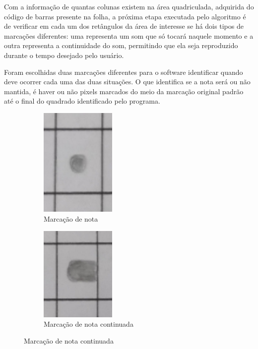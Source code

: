 \documentclass[12pt]{report}
\begin{document}
Com a informação de quantas colunas existem na área quadriculada,
adquirida do código de barras presente na folha, a próxima etapa
executada pelo algoritmo é de verificar em cada um dos retângulos da
área de interesse se há dois tipos de marcações diferentes: uma
representa um som que só tocará naquele momento e a outra representa a
continuidade do som, permitindo que ela seja reproduzido durante o
tempo desejado pelo usuário.

Foram escolhidas duas marcações diferentes para o software identificar
quando deve ocorrer cada uma das duas situações. O que identifica se a
nota será ou não mantida, é haver ou não pixels marcados do meio da
marcação original padrão até o final do quadrado identificado pelo
programa.

\begin{figure}[H]
  \centering
  \begin{subfigure}{0.4\textwidth}
    \centering
    \includegraphics[width=0.4\textwidth]{imagens/nota.jpg}
    \caption{Marcação de nota}
    \label{fig:marcacao}
  \end{subfigure}
  \begin{subfigure}{0.4\textwidth}
    \centering
    \includegraphics[width=0.4\textwidth]{imagens/nota_continuada.jpeg}
    \caption{Marcação de nota continuada}
    \label{fig:marcacao_continuada}
  \end{subfigure}%
\end{figure}
\end{document}
